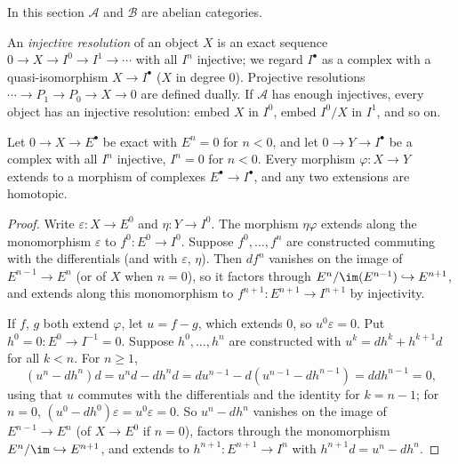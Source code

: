 In this section $\mathcal{A}$ and $\mathcal{B}$ are abelian categories.

\begin{definition}\label{homological-algebra:definition-resolution}
An \emph{injective resolution} of an object $X$ is an exact sequence $0 \to X \to I^0 \to I^1 \to \cdots$ with all $I^n$
injective; we regard $I^\bullet$ as a complex with a quasi-isomorphism $X \to I^\bullet$ ($X$ in degree $0$). Projective
resolutions $\cdots \to P_1 \to P_0 \to X \to 0$ are defined dually. If $\mathcal{A}$ has enough injectives, every object has
an injective resolution: embed $X$ in $I^0$, embed $I^0/X$ in $I^1$, and so on.
\end{definition}

\begin{theorem}\label{homological-algebra:theorem-comparison}
Let $0 \to X \to E^\bullet$ be exact with $E^n = 0$ for $n < 0$, and let $0 \to Y \to I^\bullet$ be a complex with all $I^n$ injective,
$I^n = 0$ for $n < 0$. Every morphism $\varphi \colon X \to Y$ extends to a morphism of complexes $E^\bullet \to I^\bullet$, and any two
extensions are homotopic.
\end{theorem}

\begin{proof}
Write $\varepsilon \colon X \to E^0$ and $\eta \colon Y \to I^0$. The morphism $\eta\varphi$ extends along the monomorphism $\varepsilon$ to
$f^0 \colon E^0 \to I^0$. Suppose $f^0, \ldots, f^n$ are constructed commuting with the differentials (and with $\varepsilon$, $\eta$).
Then $d f^n$ vanishes on the image of $E^{n-1} \to E^n$ (or of $X$ when $n = 0$), so it factors through
$E^n/\im(E^{n-1}) \hookrightarrow E^{n+1}$, and extends along this monomorphism to $f^{n+1} \colon E^{n+1} \to I^{n+1}$ by injectivity.

If $f$, $g$ both extend $\varphi$, let $u = f - g$, which extends $0$, so $u^0\varepsilon = 0$. Put $h^0 = 0 \colon E^0 \to I^{-1} = 0$.
Suppose $h^0, \ldots, h^n$ are constructed with $u^k = dh^k + h^{k+1}d$ for all $k < n$. For $n \geq 1$,
\[
(u^n - dh^n)d = u^nd - dh^nd = du^{n-1} - d(u^{n-1} - dh^{n-1}) = ddh^{n-1} = 0,
\]
using that $u$ commutes with the differentials and the identity for $k = n - 1$; for $n = 0$, $(u^0 - dh^0)\varepsilon = u^0\varepsilon = 0$.
So $u^n - dh^n$ vanishes on the image of $E^{n-1} \to E^n$ (of $X \to E^0$ if $n = 0$), factors through the monomorphism
$E^n/\im \hookrightarrow E^{n+1}$, and extends to $h^{n+1} \colon E^{n+1} \to I^n$ with $h^{n+1}d = u^n - dh^n$.
\end{proof}


